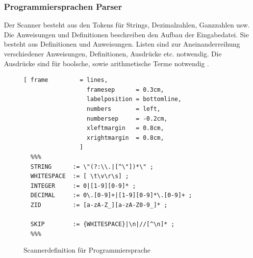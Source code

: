\subsubsection{Programmiersprachen Parser}
Der Scanner  besteht aus den Tokens für Strings, Dezimalzahlen, Ganzzahlen usw.
Die Anweisungen und Definitionen  beschreiben den Aufbau der Eingabedatei. Sie besteht aus Definitionen und Anweisungen.
Listen  sind zur Aneinanderreihung verschiedener Anweisungen, Definitionen, Ausdrücke etc. notwendig. 
Die Ausdrücke sind für boolsche, sowie arithmetische Terme notwendig .
%
\begin{figure}[!ht]

\begin{Verbatim}[ frame         = lines, 
                  framesep      = 0.3cm, 
                  labelposition = bottomline,
                  numbers       = left,
                  numbersep     = -0.2cm,
                  xleftmargin   = 0.8cm,
                  xrightmargin  = 0.8cm,
                ]
  %%%
  STRING      := \"(?:\\.|[^\"])*\" ;
  WHITESPACE  := [ \t\v\r\s] ;
  INTEGER     := 0|[1-9][0-9]* ;
  DECIMAL     := 0\.[0-9]+|[1-9][0-9]*\.[0-9]+ ;
  ZID         := [a-zA-Z_][a-zA-Z0-9_]* ;

  SKIP        := {WHITESPACE}|\n|//[^\n]* ;
  %%%
\end{Verbatim}
\caption{Scannerdefinition für Programmiersprache}
\label{fig:example_interpreter_grammar_scanner}
\end{figure}
